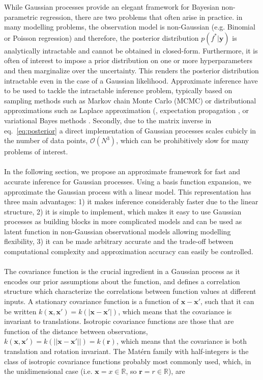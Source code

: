 \documentclass[]{interact}
\theoremstyle{plain}%
\theoremstyle{definition}
\theoremstyle{remark}
\begin{document}
While Gaussian processes provide an elegant framework for Bayesian non-parametric regression, there are two problems that often arise in practice. 
in many modelling problems, the observation model is non-Gaussian (e.g. Binomial or Poisson regression) and therefore, the posterior distribution $p(f^*| \mathbf{y})$ is analytically intractable and cannot be obtained in closed-form. Furthermore, it is often of interest to impose a prior distribution on one or more hyperparameters and then marginalize over the uncertainty. This renders the posterior distribution intractable even in the case of a Gaussian likelihood. Approximate inference have to be used to tackle the intractable inference problem, typically based on sampling methods such as Markov chain Monte Carlo (MCMC) \citep{brooks_2011} or distributional approximations such as Laplace approximation (\citep{williams1998bayesian,rasmussen2006gaussian}, expectation propagation \citep{minka2001expectation}, or variational Bayes methods \citep{gibbs2000variational,csato2000efficient}. Secondly, due to the matrix inverse in eq.~\eqref{eq:posterior} a direct implementation of Gaussian processes scales cubicly in the number of data points, $\mathcal{O}\left(N^3\right)$,  which can be prohibitively slow for many problems of interest. 
\\
\\
In the following section, we propose an approximate framework for fast and accurate inference for Gaussian processes. Using a basis function expansion, we approximate the Gaussian process with a linear model. This representation has three main advantages: 1) it makes inference considerably faster due to the linear structure, 2) it is simple to implement, which makes it easy to use Gaussian processes as building blocks in more complicated models and can be used as latent function in non-Gaussian observational models allowing modelling flexibility, 3) it can be made arbitrary accurate and the trade-off between computational complexity and approximation accuracy can easily be controlled.
\\
\\
The covariance function is the crucial ingredient in a Gaussian process as it encodes our prior assumptions about the function, and defines a correlation structure which characterize the correlations between function values at different inputs. A stationary covariance function is a function of $\mathbf{x}-\mathbf{x}'$, such that it can be written $k(\mathbf{x},\mathbf{x}') = k(|\mathbf{x}-\mathbf{x}'|)$, which means that the covariance is invariant to translations. Isotropic covariance functions are those that are function of the distance between observations, $k(\mathbf{x},\mathbf{x}') = k(||\mathbf{x}-\mathbf{x}'||) = k(\mathbf{r})$, which means that the covariance is both translation and rotation invariant. The Mat\'ern family with half-integers is the class of isotropic covariance functions probably most commonly used, which, in the unidimensional case (i.e. $\mathbf{x}=x\in \mathbb{R}$, so $\mathbf{r}=r\in \mathbb{R}$), are
\end{document}
